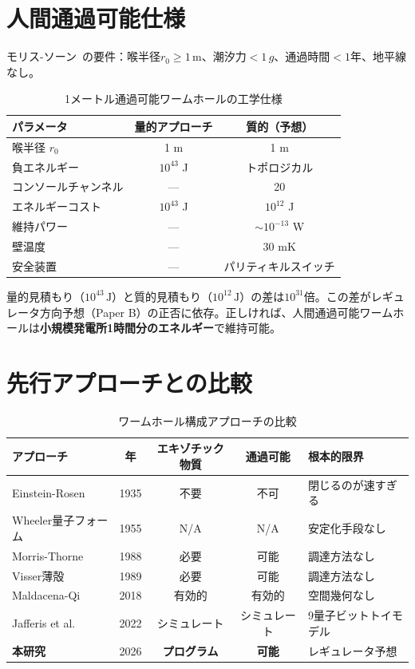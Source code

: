 \documentclass[11pt,a4paper]{article}
\begin{document}
\section{人間通過可能仕様}

モリス-ソーン~\cite{MorrisThorne1988}の要件：喉半径$r_0 \geq 1\,\mathrm{m}$、潮汐力$< 1\,g$、通過時間$< 1$年、地平線なし。

\begin{table}[h]
\centering
\caption{1メートル通過可能ワームホールの工学仕様}
\begin{tabular}{@{}lcc@{}}
\toprule
パラメータ & 量的アプローチ & 質的（予想） \\
\midrule
喉半径 $r_0$ & 1 m & 1 m \\
負エネルギー & $10^{43}$ J & トポロジカル \\
コンソールチャンネル & --- & 20 \\
エネルギーコスト & $10^{43}$ J & $10^{12}$ J \\
維持パワー & --- & $\sim 10^{-13}$ W \\
壁温度 & --- & 30 mK \\
安全装置 & --- & パリティキルスイッチ \\
\bottomrule
\end{tabular}
\end{table}

量的見積もり（$10^{43}\,\mathrm{J}$）と質的見積もり（$10^{12}\,\mathrm{J}$）の差は$10^{31}$倍。この差がレギュレータ方向予想（Paper B）の正否に依存。正しければ、人間通過可能ワームホールは\textbf{小規模発電所1時間分のエネルギー}で維持可能。

\section{先行アプローチとの比較}

\begin{table}[t]
\centering
\caption{ワームホール構成アプローチの比較}
\small
\begin{tabular}{@{}lcccp{4cm}@{}}
\toprule
アプローチ & 年 & エキゾチック物質 & 通過可能 & 根本的限界 \\
\midrule
Einstein-Rosen & 1935 & 不要 & 不可 & 閉じるのが速すぎる \\
Wheeler量子フォーム & 1955 & N/A & N/A & 安定化手段なし \\
Morris-Thorne & 1988 & 必要 & 可能 & 調達方法なし \\
Visser薄殻 & 1989 & 必要 & 可能 & 調達方法なし \\
Maldacena-Qi & 2018 & 有効的 & 有効的 & 空間幾何なし \\
Jafferis et al. & 2022 & シミュレート & シミュレート & 9量子ビットトイモデル \\
\midrule
\textbf{本研究} & 2026 & \textbf{プログラム} & \textbf{可能} & レギュレータ予想 \\
\bottomrule
\end{tabular}
\end{table}
\end{document}
